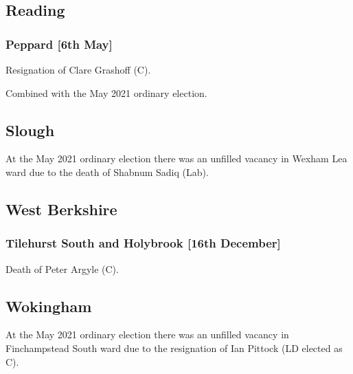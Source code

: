 \documentclass[a4paper,openany]{book}
\begin{document}
\begin{resultsiii}
\subsection*{Reading}

\subsubsection*{Peppard \hspace*{\fill}\nolinebreak[1]%
	\enspace\hspace*{\fill}
	[6th May]}


Resignation of Clare Grashoff (C).

Combined with the May 2021 ordinary election.

\subsection*{Slough}

At the May 2021 ordinary election there was an unfilled vacancy in Wexham Lea ward due to the death of Shabnum Sadiq (Lab).

\subsection*{West Berkshire}

\subsubsection*{Tilehurst South and Holybrook \hspace*{\fill}\nolinebreak[1]%
	\enspace\hspace*{\fill}
	[16th December]}


Death of Peter Argyle (C).

\subsection*{Wokingham}

At the May 2021 ordinary election there was an unfilled vacancy in Finchampstead South ward due to the resignation of Ian Pittock (LD elected as C).


\end{resultsiii}
\end{document}
